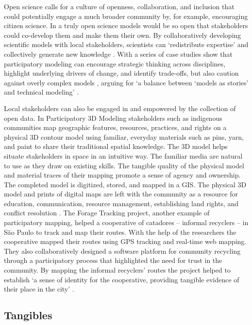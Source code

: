 \documentclass{article}
\begin{document}
Open science calls for a culture of openness, collaboration, and inclusion
that could potentially engage a much broader community 
by, for example, encouraging  citizen science. 
%
In a truly open science
models would be so open that stakeholders could co-develop them
and make them their own. 
%
By collaboratively developing scientific models 
with local stakeholders, scientists can 
`redistribute expertise' 
and collectively generate new knowledge \citep{Whatmore2011, Landstrom2011}. 
%
With a series of case studies 
\citeauthor{Sandker2010} show
that participatory modeling can 
encourage strategic thinking across disciplines, 
highlight underlying drivers of change, 
and identify trade-offs,
but also caution against overly complex models
, arguing for 
`a balance between `models as stories' and technical
modeling'
\citeyearpar{Sandker2010}.  
%

Local stakeholders can also be engaged in and empowered by the collection of open data. 
%
In Participatory 3D Modeling stakeholders such as indigenous communities 
map 
geographic features, resources, practices, and rights 
on a physical 3D contour model 
using familiar, everyday materials such as pins, yarn, and paint 
to share their traditional spatial knowledge. 
The 3D model helps situate stakeholders in space in an intuitive way.
The familiar media are natural to use as they draw on existing skills.
The tangible quality of the physical model and material traces of their mapping 
promote a sense of agency and ownership. 
%
The completed model is digitized, stored, and mapped in a GIS. 
The physical 3D model and prints of digital maps are left with the community
as a resource for
education, communication, resource management, establishing land rights, and conflict resolution 
\citep{Rambaldi2001}.
%
The Forage Tracking project, another example of participatory mapping, helped a cooperative of catadores -- informal recyclers -- 
in S\~{a}o Paulo to track and map their routes.
%
With the help of the researchers the cooperative mapped their routes using GPS tracking and real-time web mapping.
They also collaboratively designed a software platform for community recycling 
through a participatory process that highlighted the need for trust in the community. 
By mapping the informal recyclers' routes 
the project helped to establish 
`a sense of identity for the cooperative,
providing tangible evidence of their place in the city'
\citep{mit2012,Offenhuber2012}.
%

\subsection{Tangibles}
\end{document}
